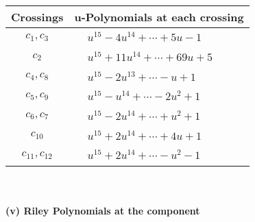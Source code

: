 \documentclass[1p]{elsarticle_modified}
\theoremstyle{definition}
\begin{document}
\begin{tabular}{m{50pt}|m{274pt}}
Crossings & \hspace{64pt}u-Polynomials at each crossing \\
\hline $$\begin{aligned}c_{1},c_{3}\end{aligned}$$&$\begin{aligned}
&u^{15}-4 u^{14}+\cdots+5 u-1
\end{aligned}$\\
\hline $$\begin{aligned}c_{2}\end{aligned}$$&$\begin{aligned}
&u^{15}+11 u^{14}+\cdots+69 u+5
\end{aligned}$\\
\hline $$\begin{aligned}c_{4},c_{8}\end{aligned}$$&$\begin{aligned}
&u^{15}-2 u^{13}+\cdots- u+1
\end{aligned}$\\
\hline $$\begin{aligned}c_{5},c_{9}\end{aligned}$$&$\begin{aligned}
&u^{15}- u^{14}+\cdots-2 u^2+1
\end{aligned}$\\
\hline $$\begin{aligned}c_{6},c_{7}\end{aligned}$$&$\begin{aligned}
&u^{15}-2 u^{14}+\cdots+u^2+1
\end{aligned}$\\
\hline $$\begin{aligned}c_{10}\end{aligned}$$&$\begin{aligned}
&u^{15}+2 u^{14}+\cdots+4 u+1
\end{aligned}$\\
\hline $$\begin{aligned}c_{11},c_{12}\end{aligned}$$&$\begin{aligned}
&u^{15}+2 u^{14}+\cdots- u^2-1
\end{aligned}$\\
\hline
\end{tabular}\\~\\
\newpage\renewcommand{\arraystretch}{1}
\flushleft \textbf{(v) Riley Polynomials at the component}\newline \\
\end{document}
